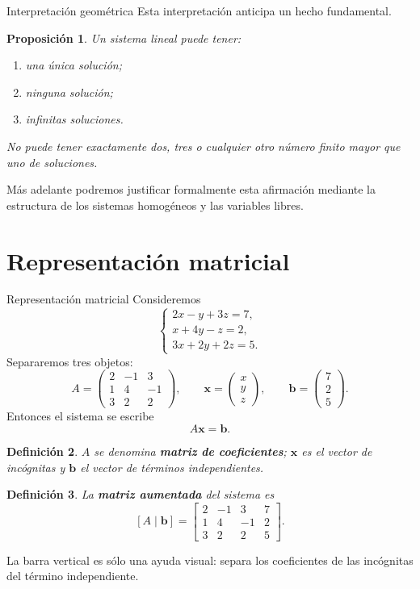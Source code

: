 \documentclass[aspectratio=169,9pt]{beamer}
\newtheorem{definicion}{Definición}[section]
\newtheorem{proposicion}[definicion]{Proposición}
\theoremstyle{remark}
\begin{document}
\begin{frame}[allowframebreaks,t]{Interpretación geométrica}
Esta interpretación anticipa un hecho fundamental.

\begin{proposicion}
Un sistema lineal puede tener:
\begin{enumerate}
\item una única solución;
\item ninguna solución;
\item infinitas soluciones.
\end{enumerate}
No puede tener exactamente dos, tres o cualquier otro número finito mayor que uno de soluciones.
\end{proposicion}

Más adelante podremos justificar formalmente esta afirmación mediante la estructura de los sistemas
homogéneos y las variables libres.
\end{frame}

\section{Representación matricial}
\begin{frame}[allowframebreaks,t]{Representación matricial}
Consideremos
\[
\begin{cases}
2x-y+3z=7,\\
x+4y-z=2,\\
3x+2y+2z=5.
\end{cases}
\]
Separaremos tres objetos:
\[
A=
\begin{pmatrix}
2&-1&3\\
1&4&-1\\
3&2&2
\end{pmatrix},
\qquad
\mathbf{x}=
\begin{pmatrix}x\\y\\z\end{pmatrix},
\qquad
\mathbf{b}=
\begin{pmatrix}7\\2\\5\end{pmatrix}.
\]
Entonces el sistema se escribe
\[
A\mathbf{x}=\mathbf{b}.
\]

\begin{definicion}
$A$ se denomina \textbf{matriz de coeficientes}; $\mathbf{x}$ es el vector de incógnitas y
$\mathbf{b}$ el vector de términos independientes.
\end{definicion}

\begin{definicion}
La \textbf{matriz aumentada} del sistema es
\[
[A\mid\mathbf b]=
\left[
\begin{array}{ccc|c}
2&-1&3&7\\
1&4&-1&2\\
3&2&2&5
\end{array}
\right].
\]
\end{definicion}

La barra vertical es sólo una ayuda visual: separa los coeficientes de las incógnitas del término
independiente.
\end{frame}
\end{document}
